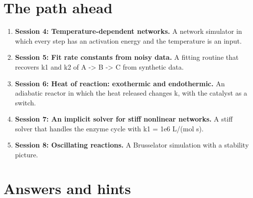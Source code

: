 \documentclass[11pt,a4paper]{article}
\begin{document}
\section{The path ahead}
\begin{enumerate}[nosep]
\item \textbf{Session 4: Temperature-dependent networks.} A network simulator in which every step has an activation energy and the temperature is an input.
\item \textbf{Session 5: Fit rate constants from noisy data.} A fitting routine that recovers k1 and k2 of A -\textgreater{} B -\textgreater{} C from synthetic data.
\item \textbf{Session 6: Heat of reaction: exothermic and endothermic.} An adiabatic reactor in which the heat released changes k, with the catalyst as a switch.
\item \textbf{Session 7: An implicit solver for stiff nonlinear networks.} A stiff solver that handles the enzyme cycle with k1 = 1e6 L/(mol s).
\item \textbf{Session 8: Oscillating reactions.} A Brusselator simulation with a stability picture.
\end{enumerate}

\section{Answers and hints}
\end{document}
